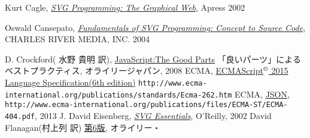 \begin{thebibliography}{99}
 \iffalse
 \bibitem{WebGL}Andreas Anyuru(吉川 邦夫 訳),
\href{http://www.amazon.co.jp/%E5%AE%9F%E8%B7%B5%E3%83%97%E3%83%AD%E3%82%B0%E3%83%A9%E3%83%9F%E3%83%B3%E3%82%B0WebGL-HTML-JavaScript%E3%81%AB%E3%82%88%E3%82%8B3D%E3%82%B0%E3%83%A9%E3%83%95%E3%82%A3%E3%83%83%E3%82%AF%E3%82%B9%E9%96%8B%E7%99%BA-Programmer%E2%80%99s-SELECTION/dp/4798129534/ref=sr_1_1?ie=UTF8&qid=1365330500&sr=8-1&keywords=%E5%AE%9F%E8%B7%B5%E3%83%97%E3%83%AD%E3%82%B0%E3%83%A9%E3%83%9F%E3%83%B3%E3%82%B0WebGL}
{実践プログラミングWebGL HTML \& JavaScriptによる３Ｄグラフィック},
				 翔泳社, 2012年
				 \fi
\iffalse\else
{} Kurt Cagle, 
   \href{http://www.amazon.co.jp/exec/obidos/ASIN/1590590198/qid=1144561984/sr=1-4/ref=sr_1_10_4/249-1775097-0214759}
     {\it SVG Programming: The Graphical Web}, Apress 2002
\fi
  Oswald Cansepato, 
	\href{http://www.amazon.co.jp/exec/obidos/ASIN/1584502983/qid=1144561984/sr=1-1/ref=sr_1_10_1/249-1775097-0214759}
     {\it Fundamentals of SVG Programming: Concept to
	Source Code}, 
     CHARLES RIVER MEDIA, INC. 2004
         \iffalse
 \bibitem{Cox}David Cox, John Little, Donal O'Shea(落合、示野、西山、室、
	山本訳), グレブナ基底と代数多
	様体入門(上), シュプリンガー・フェアラーク東京 2000
         \fi
 D. Crockford( 水野 貴明 訳),
	 \href{http://www.amazon.co.jp/JavaScript%253a-Parts-%E2%80%95%E3%80%8C%E8%89%AF%E3%81%84%E3%83%91%E3%83%BC%E3%83%84%E3%80%8D%E3%81%AB%E3%82%88%E3%82%8B%E3%83%99%E3%82%B9%E3%83%88%E3%83%97%E3%83%A9%E3%82%AF%E3%83%86%E3%82%A3%E3%82%B9-Douglas-Crockford/dp/4873113911/ref=sr_1_1?ie=UTF8&qid=1304649181&sr=8-1}{JavaScript:The Good Parts}
         「良いパーツ」によるベストプラクティス, オライリージャパン, 2008
 ECMA, 
\href{http://www.ecma-international.org/publications/standards/Ecma-262.htm}
{ECMAScript$^\copyright$ 2015 Language Specification(6th edition)}\newline
\texttt{http://www.ecma-international.org/publications/standards/Ecma-262.htm}
\ifSeminor
\else
{}ECMA,
\href{http://www.ecma-international.org/publications/files/ECMA-ST/ECMA-404.pdf}
				{JSON},
\texttt{http://www.ecma-international.org/publications/files/ECMA-ST/ECMA-404.pdf}, 2013
\fi
\ifSeminor
\else
 J. David Eisenberg,
\href{http://www.amazon.co.jp/gp/product/0596002238/250-4160686-1026605?v=glance&n=1000}{\it
	 SVG Essentials}, O'Reilly, 2002
 \fi
 David Flanagan(村上列 訳) 
\href{http://www.amazon.co.jp/JavaScript-第6版-David-Flanagan/dp/4873115736/ref=sr_1_1?ie=UTF8&qid=1353802698&sr=8-1}{\JS{} 第6版}, オライリー・

\end{thebibliography}
